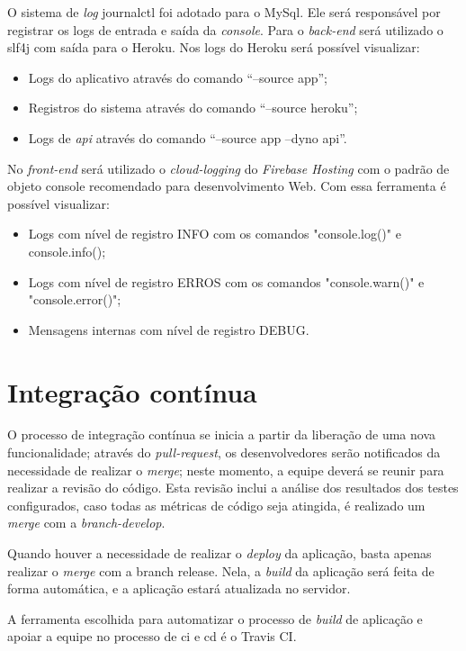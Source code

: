 \documentclass[
    12pt,               %
    openright,          %
    oneside,
    a4paper,            %
    paginasA3,  %
    english,            %
    brazil              %
    ]{ifsp-spo-inf-ctds} %
\begin{document}
O sistema de \textit{\gls{log}} \gls{journalctl} foi adotado para o MySql. Ele será responsável por registrar os logs de entrada e saída da \textit{console}. 
Para o \textit{back-end} será utilizado o \ac{slf4j} com saída para o Heroku.  Nos logs do Heroku será possível visualizar: 
\begin{itemize}
\item Logs do aplicativo através do comando “--source app”;
\item Registros do sistema através do comando “--source heroku”;
\item Logs de \textit{\ac{api}} através do comando “--source app --dyno api”.
\end{itemize}


No \textit{front-end} será utilizado o \textit{\gls{cloud-logging}} do \textit{Firebase Hosting} com o padrão de objeto console recomendado para desenvolvimento Web. Com essa ferramenta é possível visualizar:
\begin{itemize}
\item Logs com nível de registro INFO com os comandos "console.log()" e console.info();
\item Logs com nível de registro ERROS com os comandos "console.warn()" e "console.error()";
\item Mensagens internas com nível de registro DEBUG.
\end{itemize}
\section{Integração contínua}
O processo de integração contínua se inicia a partir da liberação de uma nova funcionalidade; através do \textit{\gls{pull-request}}, os desenvolvedores serão notificados da necessidade de realizar o \textit{\gls{merge}}; neste momento, a equipe deverá se reunir para realizar a revisão do código. Esta revisão inclui a análise dos resultados dos testes configurados, caso todas as métricas de código seja atingida, é realizado um \textit{\gls{merge}} com a \textit{\gls{branch-develop}}. 


Quando houver a necessidade de realizar o \textit{\gls{deploy}} da aplicação, basta apenas realizar o \textit{merge} com a branch release. Nela, a \textit{\gls{build}} da aplicação será feita de forma automática, e a aplicação estará atualizada no servidor. 


A ferramenta escolhida para automatizar o processo de \textit{\gls{build}} de aplicação e  apoiar a equipe no processo de \ac{ci} e \ac{cd} é o Travis CI.
\end{document}
